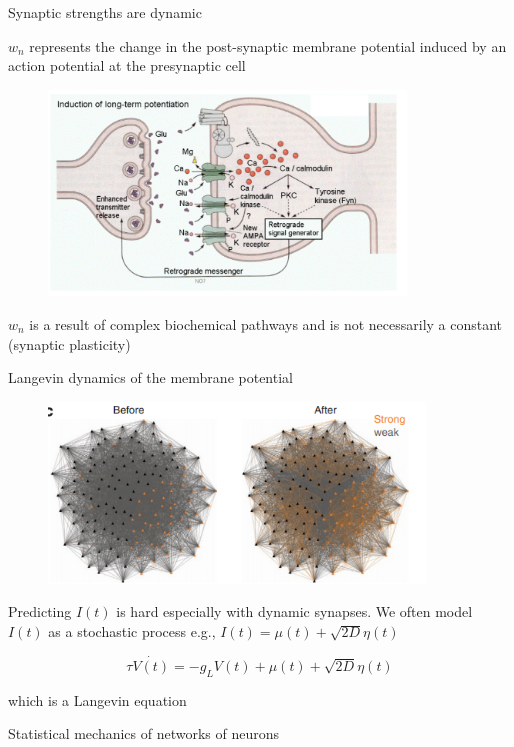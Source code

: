 \documentclass[aspectratio=169]{beamer}
\begin{document}
\begin{frame}{Synaptic strengths are dynamic}

$w_{n}$ represents the change in the post-synaptic membrane potential induced by an action potential at the presynaptic cell

\begin{figure}
\centering
\includegraphics[width=95mm]{figure-12}
\end{figure}

$w_{n}$ is a result of complex biochemical pathways and is not necessarily a constant (synaptic plasticity)

\end{frame}

\begin{frame}{Langevin dynamics of the membrane potential}

\begin{figure}
\centering
\includegraphics[width=100mm]{figure-10}
\end{figure}

Predicting $I(t)$ is hard especially with dynamic synapses. We often model $I(t)$ as a stochastic process e.g., $I(t) = \mu(t) + \sqrt{2D}\eta(t)$

\begin{equation*}
\tau\dot{V(t)} = -g_{L}V(t) + \mu(t) + \sqrt{2D}\eta(t)
\end{equation*}

which is a Langevin equation

\end{frame}

\begin{frame}{Statistical mechanics of networks of neurons}

\end{frame}
\end{document}
